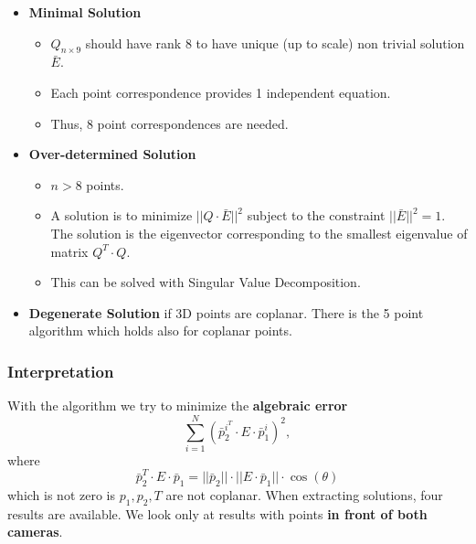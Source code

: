 \documentclass[a4paper,12 pt]{article}
\theoremstyle{definition}
\theoremstyle{remark}
\theoremstyle{definition}
\theoremstyle{definition}
\theoremstyle{definition}
\theoremstyle{remark}
\theoremstyle{definition}
\begin{document}
\begin{itemize}
\item \textbf{Minimal Solution}
\begin{itemize}
\item $Q_{n\times 9}$ should have rank $8$ to have unique (up to scale) non trivial solution $\bar{E}$.
\item Each point correspondence provides 1 independent equation.
\item Thus, 8 point correspondences are needed.
\end{itemize}
\item \textbf{Over-determined Solution}
\begin{itemize}
\item $n>8$ points.
\item A solution is to minimize $||Q\cdot \bar{E}||^2$ subject to the constraint $||\bar{E}||^2=1$. The solution is the eigenvector corresponding to the smallest eigenvalue of matrix $Q^T\cdot Q$.
\item This can be solved with Singular Value Decomposition.
\end{itemize}
\item \textbf{Degenerate Solution} if 3D points are coplanar. There is the 5 point algorithm which holds also for coplanar points.
\end{itemize}
\subsubsection*{Interpretation}
With the algorithm we try to minimize the \textbf{algebraic error}
\begin{equation}
\sum_{i=1}^{N} (\bar{p}_{2}^{i^T}\cdot E \cdot \bar{p}_1^i)^2,
\end{equation}
where
\begin{equation}
\bar{p}_2^T\cdot E \cdot \bar{p}_1 = ||\bar{p}_2||\cdot ||E\cdot \bar{p}_1||\cdot \cos(\theta)
\end{equation}
which is not zero is $p_1,p_2,T$ are not coplanar.
When extracting solutions, four results are available. We look only at results with points \textbf{in front of both cameras}.
\end{document}
